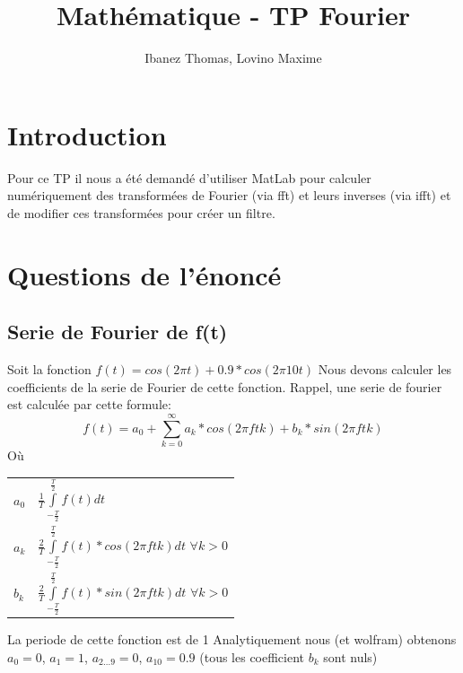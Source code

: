 \documentclass[a4paper,11pt]{article}
\title{Mathématique - TP Fourier}
\author{Ibanez Thomas, Lovino Maxime}
\makeatletter
\newenvironment{conditions}
  {\par\vspace{\abovedisplayskip}\noindent\begin{tabular}{>{$}l<{$} @{${}={}$} l}}
  {\end{tabular}\par\vspace{\belowdisplayskip}}
\makeatother
\begin{document}
\maketitle
\section{Introduction}
Pour ce TP il nous a été demandé d'utiliser MatLab pour calculer numériquement des transformées de Fourier (via fft) et leurs inverses (via ifft) et de modifier ces transformées pour créer un filtre.
\section{Questions de l'énoncé}

\subsection{Serie de Fourier de f(t)}
Soit la fonction $f(t) = cos(2\pi t) + 0.9*cos(2\pi 10t)$ \newline
Nous devons calculer les coefficients de la serie de Fourier de cette fonction. Rappel, une serie de fourier est calculée par cette formule: 
\begin{equation*}
f(t) = a_0 + \sum_{k=0}^\infty a_k * cos(2\pi f tk) + b_k * sin(2\pi f tk)
\end{equation*}
Où
\begin{conditions}
a_0 &  $\frac{1}{T} \int\limits_{-\frac{T}{2}}^{\frac{T}{2}}  f(t) dt $ \\
a_k &  $\frac{2}{T} \int\limits_{-\frac{T}{2}}^{\frac{T}{2}} f(t) * cos(2\pi ftk) dt$ $ \forall k > 0$\\
b_k & $\frac{2}{T} \int\limits_{-\frac{T}{2}}^{\frac{T}{2}} f(t) * sin(2\pi ftk) dt$ $ \forall k > 0$
\end{conditions}
La periode de cette fonction est de 1 \newline
Analytiquement nous (et wolfram) obtenons
$a_0 = 0$, $a_1 = 1$, $a_{2...9} = 0$, $a_{10} = 0.9$ (tous les coefficient $b_k$ sont nuls)
\end{document}

